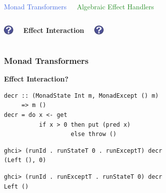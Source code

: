 \documentclass[xcolor=pdftex,dvipsnames,table]{beamer}
\def\questionmark{\includegraphics[height=0.5cm]{question_mark.png}}
\begin{document}
\begin{frame}
  \begin{columns}[c]
    \begin{center}
      \Large{\textcolor{RoyalBlue}{Monad Transformers}}
    \end{center}
    \begin{center}
      \Large{\textcolor{ForestGreen}{Algebraic Effect Handlers}}
    \end{center}
  \end{columns}
  \bigskip
  \bigskip
  \begin{columns}[c]
    \begin{center}
      \questionmark
    \end{center}
    \begin{center}
      \textbf{Effect Interaction}
    \end{center}
    \begin{center}
      \questionmark
    \end{center}
  \end{columns}
\end{frame}

{
\begin{frame}[fragile, t]
  \frametitle{Monad Transformers}
  \begin{center}
    \textbf{\Large{Effect Interaction?}}
  \end{center}
  \begin{verbatim}
decr :: (MonadState Int m, MonadExcept () m)
     => m ()
decr = do x <- get
          if x > 0 then put (pred x)
                   else throw ()
  \end{verbatim}
  \pause
  \begin{verbatim}
ghci> (runId . runStateT 0 . runExceptT) decr
(Left (), 0)
  \end{verbatim}
  \pause
  \begin{verbatim}
ghci> (runId . runExceptT . runStateT 0) decr
Left ()
  \end{verbatim}
\end{frame}
}
\end{document}
